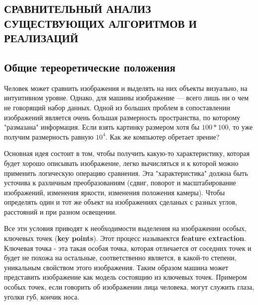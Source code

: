 \begin{center}
    \section*{СРАВНИТЕЛЬНЫЙ АНАЛИЗ СУЩЕСТВУЮЩИХ АЛГОРИТМОВ И РЕАЛИЗАЦИЙ}    
\end{center}

\subsection*{Общие тереоретические положения}   

\tab Человек может сравнить изображения и выделять на них объекты визуально, на интуитивном уровне. Однако, для машины изображение — всего лишь ни о чем не говорящий набор данных. Одной из больших проблем в сопоставлении изображений является очень большая размерность пространства, по которому "размазана" информация. Если взять картинку размером хотя бы $100*100$, то уже получим размерность равную $10^4$. Как же компьютер обретает зрение?

\vspace{1em}

Основная идея состоит в том, чтобы получить какую-то характеристику, которая будет хорошо описывать изображение, легко вычисляться и к которой можно применить логическую операцию сравнения. Эта "характеристика" должна быть усточива к различным преобразованиям (сдвиг, поворот и масштабирование изображений, изменения яркости, изменения положения камеры). Чтобы определять один и тот же объект на изображениях сделаных с разных углов, расстояний и при разном освещении.

\vspace{1em}

Все эти условия приводят к необходимости выделения на изображении особых, ключевых точек (\textbf{key points}). Этот процесс называектся \textbf{feature extraction}. Ключевая точка - эта такая особая точка, которая отличается от соседних точек и будет не похожа на остальные, соответственно является, в какой-то степени, уникальным свойством этого изображения. Таким образом машина может представить изображение как модель состоящию из ключевых точек. Примером особых точек, если говорить об изображении лица человека, могут служить глаза, уголки губ, кончик носа. 

\vspace{1em}

